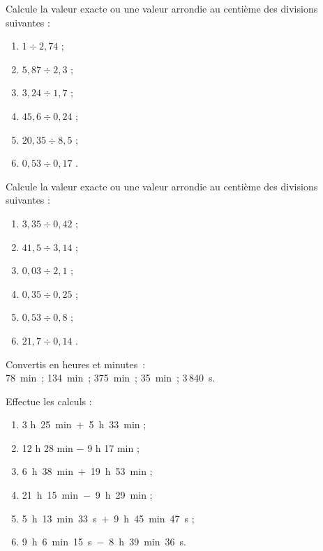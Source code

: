 \begin{exercice} 
Calcule la valeur exacte ou une valeur arrondie au centième des divisions suivantes :
\begin{enumerate} 
 \item $1 \div 2,74$ \dotfill ; 

 \item $5,87 \div 2,3$ \dotfill ; 

 \item $3,24 \div 1,7$ \dotfill ; 

 \item $45,6 \div 0,24$ \dotfill ; 

 \item $20,35 \div 8,5$ \dotfill ; 

 \item $0,53 \div 0,17$ \dotfill. 
 \end{enumerate}
\end{exercice}


\begin{exercice} 
Calcule la valeur exacte ou une valeur arrondie au centième des divisions suivantes :
\begin{enumerate} 
 \item $3,35 \div 0,42$ \dotfill ; 

 \item $41,5 \div 3,14$ \dotfill ; 

 \item $ 0,03 \div 2,1$ \dotfill ; 

 \item $0,35 \div 0,25$ \dotfill ; 

 \item $0,53 \div 0,8$ \dotfill ; 

 \item $21,7 \div 0,14$ \dotfill. 
 \end{enumerate}
\end{exercice}





\begin{exercice}
Convertis en heures et minutes :\\
78 min ; 134 min ; 375 min ; 35 min ; 3\,840 s.
\end{exercice}


\begin{exercice}
Effectue les calculs :
\begin{enumerate} 
 \item 3 h 25 min $+$ 5 h 33 min ;
 \item 12 h 28 min $-$ 9 h 17 min ;
 \item 6 h 38 min $+$ 19 h 53 min ;
 \item 21 h 15 min $-$ 9 h 29 min ;
 \item 5 h 13 min 33 s $+$ 9 h 45 min 47 s ;
 \item 9 h 6 min 15 s $-$ 8 h 39 min 36 s.
 \end{enumerate}
\end{exercice}


